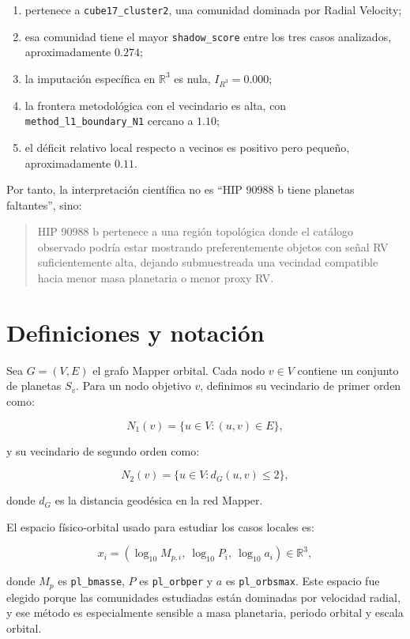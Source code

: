 \documentclass[11pt]{article}
\begin{document}
\begin{enumerate}
    \item pertenece a \texttt{cube17\_cluster2}, una comunidad dominada por Radial Velocity;
    \item esa comunidad tiene el mayor \texttt{shadow\_score} entre los tres casos analizados, aproximadamente $0.274$;
    \item la imputación específica en $\mathbb{R}^3$ es nula, $I_{R^3}=0.000$;
    \item la frontera metodológica con el vecindario es alta, con \texttt{method\_l1\_boundary\_N1} cercano a $1.10$;
    \item el déficit relativo local respecto a vecinos es positivo pero pequeño, aproximadamente $0.11$.
\end{enumerate}

Por tanto, la interpretación científica no es ``HIP 90988 b tiene planetas faltantes'', sino:

\begin{quote}
HIP 90988 b pertenece a una región topológica donde el catálogo observado podría estar mostrando preferentemente objetos con señal RV suficientemente alta, dejando submuestreada una vecindad compatible hacia menor masa planetaria o menor proxy RV.
\end{quote}

\section{Definiciones y notación}

Sea $G=(V,E)$ el grafo Mapper orbital. Cada nodo $v\in V$ contiene un conjunto de planetas $S_v$. Para un nodo objetivo $v$, definimos su vecindario de primer orden como:

\[
N_1(v)=\{u\in V:(u,v)\in E\},
\]

y su vecindario de segundo orden como:

\[
N_2(v)=\{u\in V:d_G(u,v)\leq 2\},
\]

donde $d_G$ es la distancia geodésica en la red Mapper.

El espacio físico-orbital usado para estudiar los casos locales es:

\[
x_i=
\left(
\log_{10}M_{p,i},\
\log_{10}P_i,\
\log_{10}a_i
\right)
\in \mathbb{R}^3,
\]

donde $M_p$ es \texttt{pl\_bmasse}, $P$ es \texttt{pl\_orbper} y $a$ es \texttt{pl\_orbsmax}. Este espacio fue elegido porque las comunidades estudiadas están dominadas por velocidad radial, y ese método es especialmente sensible a masa planetaria, periodo orbital y escala orbital.
\end{document}
